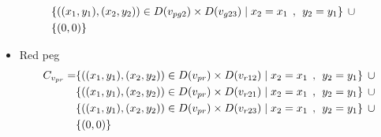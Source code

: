 \begin{appendices}
\begin{itemize}
\begin{align*}
\\&\{ ((x_{1},y_{1}),(x_{2},y_{2}))\in D(v_{pg2}) \times D(v_{g23})\mid x_{2} = x_{1} \hspace{1ex} , \hspace{1ex}  y_{2} = y_{1}\} \hspace{1ex} \cup 
\\&\{(0,0)\}
\end{align*}
  \item Red peg
  \begin{align*}
C_{v_{pr}} = &\{((x_{1},y_{1}),(x_{2},y_{2}))\in D(v_{pr}) \times D(v_{r12})\mid x_{2} = x_{1} \hspace{1ex} , \hspace{1ex}  y_{2} = y_{1}\} \hspace{1ex} \cup 
\\&\{((x_{1},y_{1}),(x_{2},y_{2}))\in D(v_{pr}) \times D(v_{r21})\mid x_{2} = x_{1} \hspace{1ex} , \hspace{1ex}  y_{2} = y_{1}\} \hspace{1ex} \cup 
\\&\{ ((x_{1},y_{1}),(x_{2},y_{2}))\in D(v_{pr}) \times D(v_{r23})\mid x_{2} = x_{1} \hspace{1ex} , \hspace{1ex}  y_{2} = y_{1}\}\hspace{1ex} \cup 
\\& \{(0,0)\}
\end{align*}
\end{itemize}


\end{appendices}